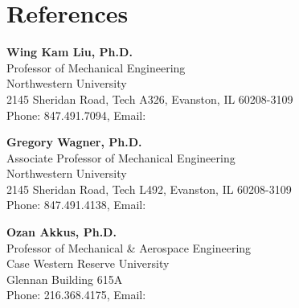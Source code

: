 \documentclass[11pt, letterpaper]{article}
\begin{document}
\ifdefined\isreferences
\section{References}

    \begin{onecolentry}
        \textbf{Wing Kam Liu, Ph.D.}\\
        Professor of Mechanical Engineering\\
        Northwestern University\\
        2145 Sheridan Road, Tech A326, Evanston, IL 60208-3109\\
        Phone: 847.491.7094, Email: 
    \end{onecolentry}
    \vspace{5 pt}

    \begin{onecolentry}
        \textbf{Gregory Wagner, Ph.D.}\\
        Associate Professor of Mechanical Engineering\\
        Northwestern University\\
        2145 Sheridan Road, Tech L492, Evanston, IL 60208-3109\\
        Phone: 847.491.4138, Email: 
    \end{onecolentry}
    \vspace{5 pt}

    \begin{onecolentry}
        \textbf{Ozan Akkus, Ph.D.}\\
        Professor of Mechanical \& Aerospace Engineering\\
        Case Western Reserve University\\
        Glennan Building 615A\\
        Phone: 216.368.4175, Email: 
    \end{onecolentry}
\fi
\end{document}
